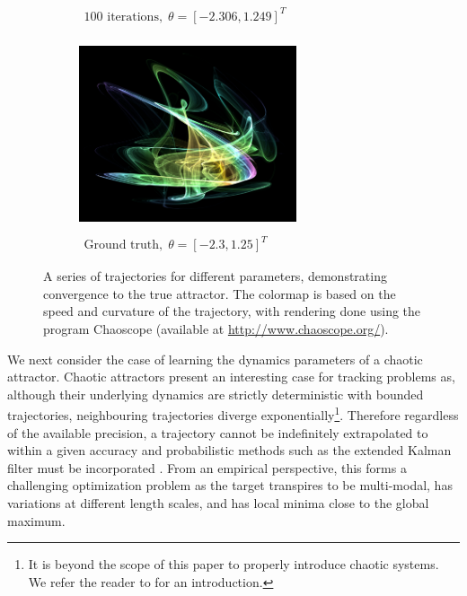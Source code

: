 \begin{figure}[p]
\begin{subfigure}[t]{0.48\textwidth}
		\caption{{$\begin{array}{c}
				\text{100 iterations}, \;
				\theta = [-2.306,1.249]^T 
				\end{array}$}}
	\end{subfigure}
	\begin{subfigure}[t]{0.48\textwidth}
		\centering
		\tiny
		\includegraphics[height=5.6cm,width=6.4cm]{chaos/compressed/target_light.png}
		\caption{{$\begin{array}{c}
				\text{Ground truth}, \;
				\theta = [-2.3,1.25]^T
				\end{array}$}}
	\end{subfigure}
	\caption{A series of trajectories for different parameters, demonstrating convergence to the true attractor.  The colormap is based on the speed and curvature of the trajectory, with rendering done using the program Chaoscope (available at {\href{http://www.chaoscope.org/}{http://www.chaoscope.org/}}). \label{fig:chaoscope}}
\end{figure}

We next consider the case of learning the dynamics parameters of a chaotic attractor.  Chaotic attractors present an interesting case for tracking problems as, although their underlying dynamics are strictly deterministic with bounded trajectories, neighbouring trajectories diverge exponentially\footnote{It is beyond the scope of this paper to properly introduce chaotic systems.  We refer the reader to \cite{devaney1989introduction} for an introduction.}.  Therefore regardless of the available precision, a trajectory cannot be indefinitely extrapolated to within a given accuracy and probabilistic methods such as the extended Kalman filter must be incorporated \citep{fujii2013extended,ruan2003chaotic}. From an empirical perspective, this forms a challenging optimization problem as the target transpires to be multi-modal, has variations at different length scales, and has local minima close to the global maximum.

